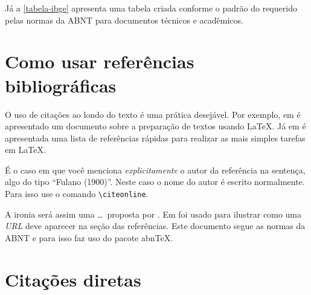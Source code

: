 Já a \autoref{tabela-ibge} apresenta uma tabela criada conforme o padrão do  requerido pelas normas da ABNT para documentos técnicos e acadêmicos.

\begin{table}[htb]
\end{table}



\section{Como usar referências bibliográficas}
\label{s_c3_referencias}

O uso de citações ao londo do texto é uma prática desejável. Por exemplo, em \cite{lamport94} é apresentado um documento sobre a preparação de textos usando \LaTeX. Já em \cite{goossens94} é apresentada uma lista de referências rápidas para realizar as mais simples tarefas em \LaTeX.

É o caso em que você menciona \emph{explicitamente} o autor da referência na sentença, algo
do tipo ``Fulano (1900)''. Neste caso o nome do autor é escrito
normalmente. Para isso use o comando \verb+\citeonline+.

A ironia será assim uma \ldots\ proposta  por . Em \cite{exemplo} foi usado para ilustrar como uma \textit{URL} deve aparecer na seção das referências. Este documento segue as normas da \ac{ABNT} e para isso faz uso do pacote \ac{abnTeX}.


\section{Citações diretas}
\label{sec-citacao}

